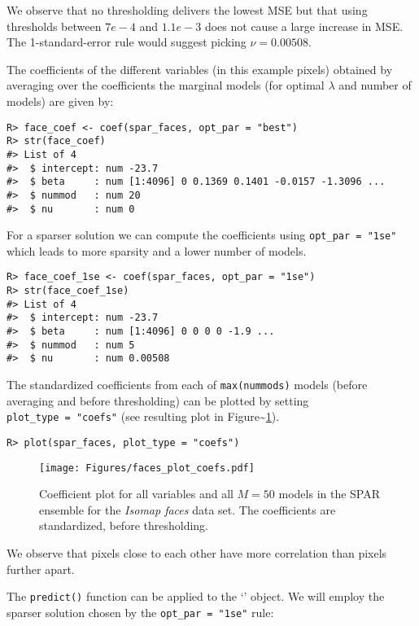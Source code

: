 \documentclass[
  article]{jss}
\newcommand{\class}[1]{`\code{#1}'}
\begin{document}
We observe that no thresholding delivers the lowest MSE but that using
thresholds between \(7e-4\) and \(1.1e-3\) does not cause a large
increase in MSE. The 1-standard-error rule would suggest picking
\(\nu=0.00508\).

The coefficients of the different variables (in this example pixels)
obtained by averaging over the coefficients the marginal models (for
optimal \(\lambda\) and number of models) are given by:

\begin{verbatim}
R> face_coef <- coef(spar_faces, opt_par = "best")
R> str(face_coef)
#> List of 4
#>  $ intercept: num -23.7
#>  $ beta     : num [1:4096] 0 0.1369 0.1401 -0.0157 -1.3096 ...
#>  $ nummod   : num 20
#>  $ nu       : num 0
\end{verbatim}

For a sparser solution we can compute the coefficients using
\texttt{opt\_par\ =\ "1se"} which leads to more sparsity and a lower
number of models.

\begin{verbatim}
R> face_coef_1se <- coef(spar_faces, opt_par = "1se")
R> str(face_coef_1se)
#> List of 4
#>  $ intercept: num -23.7
#>  $ beta     : num [1:4096] 0 0 0 0 -1.9 ...
#>  $ nummod   : num 5
#>  $ nu       : num 0.00508
\end{verbatim}

The standardized coefficients from each of \texttt{max(nummods)} models
(before averaging and before thresholding) can be plotted by setting
\texttt{plot\_type\ =\ "coefs"} (see resulting plot in
Figure\textasciitilde{}\ref{fig:faces_coefs}).

\begin{verbatim}
R> plot(spar_faces, plot_type = "coefs")
\end{verbatim}

\begin{figure}[t!]
\centering
\texttt{[image: Figures/faces\_plot\_coefs.pdf]}
\caption{Coefficient plot for all variables and all $M=50$ models in the SPAR ensemble for the \emph{Isomap faces} data set. The coefficients are standardized, before thresholding.
\label{fig:faces_coefs}}
\end{figure}

We observe that pixels close to each other have more correlation than
pixels further apart.

The \texttt{predict()} function can be applied to the \class{spar.cv}
object. We will employ the sparser solution chosen by the
\texttt{opt\_par\ =\ "1se"} rule:
\end{document}
